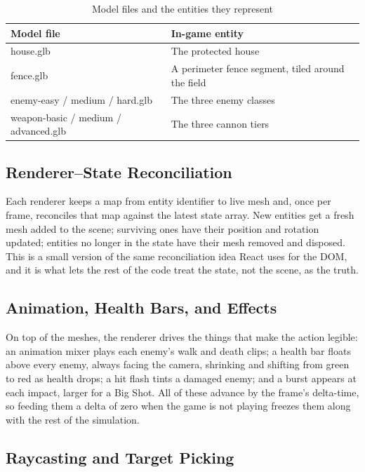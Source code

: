\documentclass[12pt,a4paper]{report}
\begin{document}
\begin{table}[htbp]
\centering
\caption{Model files and the entities they represent}
\label{tab:models}
\begin{tabular}{|p{5.5cm}|p{6.5cm}|}
\hline
Model file & In-game entity \\
\hline
house.glb & The protected house \\
\hline
fence.glb & A perimeter fence segment, tiled around the field \\
\hline
enemy-easy / medium / hard.glb & The three enemy classes \\
\hline
weapon-basic / medium / advanced.glb & The three cannon tiers \\
\hline
\end{tabular}
\end{table}

\subsection{Renderer--State Reconciliation}

Each renderer keeps a map from entity identifier to live mesh and, once per
frame, reconciles that map against the latest state array. New entities get a
fresh mesh added to the scene; surviving ones have their position and rotation
updated; entities no longer in the state have their mesh removed and disposed.
This is a small version of the same reconciliation idea React uses for the DOM,
and it is what lets the rest of the code treat the state, not the scene, as the
truth.

\subsection{Animation, Health Bars, and Effects}

On top of the meshes, the renderer drives the things that make the action
legible: an animation mixer plays each enemy's walk and death clips; a health bar
floats above every enemy, always facing the camera, shrinking and shifting from
green to red as health drops; a hit flash tints a damaged enemy; and a burst
appears at each impact, larger for a Big Shot. All of these advance by the
frame's delta-time, so feeding them a delta of zero when the game is not playing
freezes them along with the rest of the simulation.

\subsection{Raycasting and Target Picking}
\end{document}
